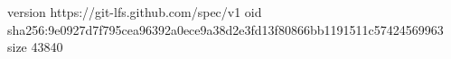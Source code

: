 version https://git-lfs.github.com/spec/v1
oid sha256:9e0927d7f795cea96392a0ece9a38d2e3fd13f80866bb1191511c57424569963
size 43840
